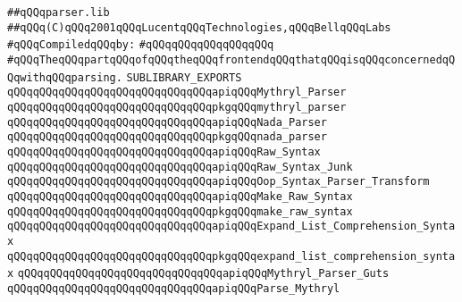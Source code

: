 \label{src/lib/compiler/front/parser/parser.sublib}
\verb|##qQQqparser.lib|\newline
\verb|##qQQq(C)qQQq2001qQQqLucentqQQqTechnologies,qQQqBellqQQqLabs|\newline
\newline
\verb|#qQQqCompiledqQQqby:|\newline
\verb|#qQQqqQQqqQQqqQQqqQQq|\newline
\newline
\verb|#qQQqTheqQQqpartqQQqofqQQqtheqQQqfrontendqQQqthatqQQqisqQQqconcernedqQQqwithqQQqparsing.|\newline
\newline
\newline
\verb|SUBLIBRARY_EXPORTS|\newline
\newline
\verb|qQQqqQQqqQQqqQQqqQQqqQQqqQQqqQQqapiqQQqMythryl_Parser|\newline
\verb|qQQqqQQqqQQqqQQqqQQqqQQqqQQqqQQqpkgqQQqmythryl_parser|\newline
\newline
\verb|qQQqqQQqqQQqqQQqqQQqqQQqqQQqqQQqapiqQQqNada_Parser|\newline
\verb|qQQqqQQqqQQqqQQqqQQqqQQqqQQqqQQqpkgqQQqnada_parser|\newline
\newline
\verb|qQQqqQQqqQQqqQQqqQQqqQQqqQQqqQQqapiqQQqRaw_Syntax|\newline
\verb|qQQqqQQqqQQqqQQqqQQqqQQqqQQqqQQqapiqQQqRaw_Syntax_Junk|\newline
\newline
\verb|qQQqqQQqqQQqqQQqqQQqqQQqqQQqqQQqapiqQQqOop_Syntax_Parser_Transform|\newline
\newline
\verb|qQQqqQQqqQQqqQQqqQQqqQQqqQQqqQQqapiqQQqMake_Raw_Syntax|\newline
\verb|qQQqqQQqqQQqqQQqqQQqqQQqqQQqqQQqpkgqQQqmake_raw_syntax|\newline
\newline
\verb|qQQqqQQqqQQqqQQqqQQqqQQqqQQqqQQqapiqQQqExpand_List_Comprehension_Syntax|\newline
\verb|qQQqqQQqqQQqqQQqqQQqqQQqqQQqqQQqpkgqQQqexpand_list_comprehension_syntax|\newline
\newline
\verb|qQQqqQQqqQQqqQQqqQQqqQQqqQQqqQQqapiqQQqMythryl_Parser_Guts|\newline
\verb|qQQqqQQqqQQqqQQqqQQqqQQqqQQqqQQqapiqQQqParse_Mythryl|\newline
